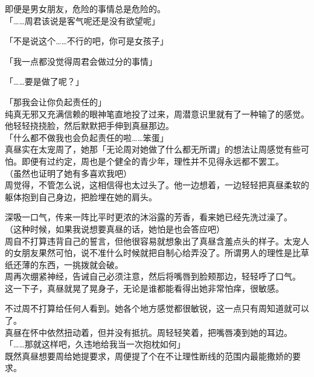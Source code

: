即便是男女朋友，危险的事情总是危险的。\\

「……周君该说是客气呢还是没有欲望呢」

「不是说这个……不行的吧，你可是女孩子」

「我一点都没觉得周君会做过分的事情」

「……要是做了呢？」

「那我会让你负起责任的」\\

纯真无邪又充满信赖的眼神笔直地投了过来，周潜意识里就有了一种输了的感觉。他轻轻挠挠脸，然后默默把手伸到真昼那边。\\

「什么都不做我也会负起责任的啦……笨蛋」\\

真昼实在太宠周了，她那「无论周对她做了什么都无所谓」的想法让周感觉有些可怕。即便有过约定，周也是个健全的青少年，理性并不见得永远都不罢工。\\

（虽然也证明了她有多喜欢我吧）\\

周觉得，不管怎么说，这相信得也太过头了。他一边想着，一边轻轻把真昼柔软的躯体抱到自己身边，把脸埋在她的肩头。

深吸一口气，传来一阵比平时更浓的沐浴露的芳香，看来她已经先洗过澡了。\\

（这种时候，如果我说想要真昼的话，她怕是也会答应吧）\\

周自不打算违背自己的誓言，但他很容易就想象出了真昼含羞点头的样子。太宠人的女朋友果然可怕，说不准什么时候就把自制心给弄没了。所谓男人的理性是比草纸还薄的东西，一挑拨就会破。\\

周再次绷紧神经，告诫自己必须注意，然后将嘴唇到脸颊那边，轻轻呼了口气。\\

这一下子，真昼就晃了晃身子，无论是谁都能看得出她非常怕痒，很敏感。

不过周不打算给任何人看到。她各个地方感觉都很敏锐，这一点只有周知道就可以了。\\

真昼在怀中依然扭动着，但并没有抵抗。周轻轻笑着，把嘴唇凑到她的耳边。\\

「……那就这样吧，久违地给我当一次抱枕如何」\\

既然真昼想要周给她提要求，周便提了个在不让理性断线的范围内最能撒娇的要求。\\

